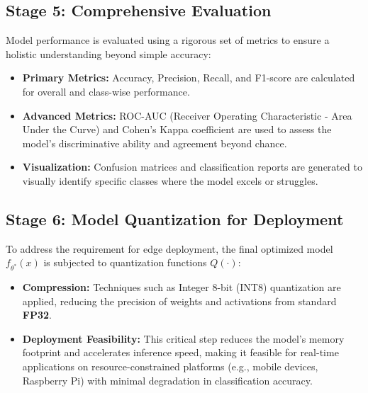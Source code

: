 \documentclass[12pt, a4paper]{report}
\begin{document}
\subsection{Stage 5: Comprehensive Evaluation}
\label{sec:evaluation}
Model performance is evaluated using a rigorous set of metrics to ensure a holistic understanding beyond simple accuracy:
\begin{itemize}
    \item \textbf{Primary Metrics:} Accuracy, Precision, Recall, and F1-score are calculated for overall and class-wise performance.
    \item \textbf{Advanced Metrics:} ROC-AUC (Receiver Operating Characteristic - Area Under the Curve) and Cohen's Kappa coefficient are used to assess the model's discriminative ability and agreement beyond chance.
    \item \textbf{Visualization:} Confusion matrices and classification reports are generated to visually identify specific classes where the model excels or struggles.
\end{itemize}

\subsection{Stage 6: Model Quantization for Deployment}
\label{sec:quantization}
To address the requirement for edge deployment, the final optimized model $f_{\theta^*}(x)$ is subjected to quantization functions $Q(\cdot)$:
\begin{itemize}
    \item \textbf{Compression:} Techniques such as Integer 8-bit (INT8) quantization are applied, reducing the precision of weights and activations from standard \textbf{FP32}.
    \item \textbf{Deployment Feasibility:} This critical step reduces the model's memory footprint and accelerates inference speed, making it feasible for real-time applications on resource-constrained platforms (e.g., mobile devices, Raspberry Pi) with minimal degradation in classification accuracy.
\end{itemize}
\end{document}
